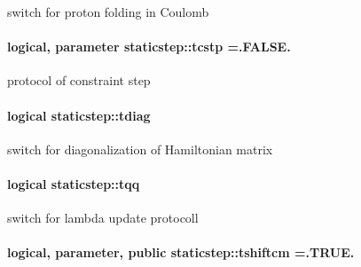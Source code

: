 switch for proton folding in Coulomb 

\paragraph[{\texorpdfstring{tcstp}{tcstp}}]{\setlength{\rightskip}{0pt plus 5cm}logical, parameter staticstep\+::tcstp =.F\+A\+L\+S\+E.\hspace{0.3cm}{\ttfamily [private]}}\hypertarget{namespacestaticstep_a7fb35294b1ede0791d641687cc28fda6}{}\label{namespacestaticstep_a7fb35294b1ede0791d641687cc28fda6}


protocol of constraint step 

\paragraph[{\texorpdfstring{tdiag}{tdiag}}]{\setlength{\rightskip}{0pt plus 5cm}logical staticstep\+::tdiag\hspace{0.3cm}{\ttfamily [private]}}\hypertarget{namespacestaticstep_a3022db879b3a7ffd372a54b71707aca2}{}\label{namespacestaticstep_a3022db879b3a7ffd372a54b71707aca2}


switch for diagonalization of Hamiltonian matrix 

\paragraph[{\texorpdfstring{tqq}{tqq}}]{\setlength{\rightskip}{0pt plus 5cm}logical staticstep\+::tqq\hspace{0.3cm}{\ttfamily [private]}}\hypertarget{namespacestaticstep_a97336d9d1daa4f79275cfd369eb7b8a4}{}\label{namespacestaticstep_a97336d9d1daa4f79275cfd369eb7b8a4}


switch for lambda update protocoll 

\paragraph[{\texorpdfstring{tshiftcm}{tshiftcm}}]{\setlength{\rightskip}{0pt plus 5cm}logical, parameter, public staticstep\+::tshiftcm =.T\+R\+U\+E.}\hypertarget{namespacestaticstep_adc9c0c23d06e25e92e85a216712c6154}{}\label{namespacestaticstep_adc9c0c23d06e25e92e85a216712c6154}


